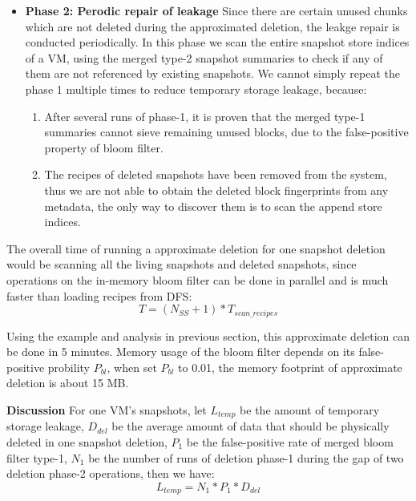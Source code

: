 \begin{itemize}
\item {\bf Phase 2: Perodic repair of leakage}
Since there are certain unused chunks which are not deleted during
the approximated deletion, the leakge repair is conducted periodically.
In this phase we scan the entire snapshot store indices of a VM, 
using the merged type-2 snapshot summaries to check if any of them are not
referenced by existing snapshots.
We cannot simply repeat the phase 1 multiple times to reduce temporary storage leakage, because:
\begin{enumerate} 
\item After several runs of phase-1, it is proven that the merged type-1 summaries cannot sieve remaining unused blocks, due to the false-positive property of bloom filter.
\item The recipes of deleted snapshots have been removed from the system, thus we are not able to obtain the deleted block fingerprints from any metadata, the only way to discover them is to scan the append store indices.
\end{enumerate}
\end{itemize}






The overall time of running a approximate deletion for one snapshot deletion would be scanning
all the living snapshots and deleted snapshots, since operations on the in-memory bloom filter can be done in
parallel and is much faster than loading recipes from DFS:
\begin{equation}
T = (N_{SS} + 1) * T_{scan\_recipes}
\end{equation}

Using the example and analysis in previous section, this approximate deletion can be done in 5 minutes.
Memory usage of the bloom filter depends on its false-positive probility $P_{bl}$,
when set $P_{bl}$ to 0.01, the memory footprint of approximate deletion is about 15 MB.
~



{\bf Discussion}
For one VM's snapshots, let $L_{temp}$ be the amount of temporary storage leakage, 
$D_{del}$ be the average amount of data that should be physically deleted in one snapshot deletion,
$P_{1}$ be the false-positive rate of merged bloom filter type-1,
$N_1$ be the number of runs of deletion phase-1 during the gap of two deletion phase-2 operations, then we have:
\begin{equation}
L_{temp} = N_1 * P_1 * D_{del}
\end{equation}

